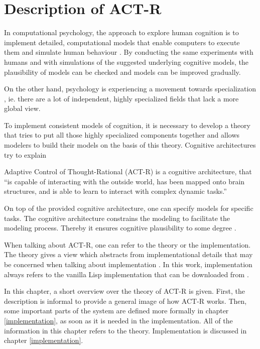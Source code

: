 \chapter{Description of ACT-R}

In computational psychology, the approach to explore human cognition is to implement detailed, computational models that enable computers to execute them and simulate human behaviour \cite{sun_introduction_2008}. By conducting the same experiments with humans and with simulations of the suggested underlying cognitive models, the plausibility of models can be checked and models can be improved gradually.

On the other hand, psychology is experiencing a movement towards specialization \cite{anderson_integrated_2004}, ie. there are a lot of independent, highly specialized fields that lack a more global view.

To implement consistent models of cognition, it is necessary to develop a theory that tries to put all those highly specialized components together and allows modelers to build their models on the basis of this theory. Cognitive architectures try to explain 


Adaptive Control of Thought-Rational  (ACT-R) is a cognitive architecture, that ``is capable of interacting with the outside world, has been mapped onto brain structures, and is able to learn to interact with complex dynamic tasks.'' \cite[p. 29]{taatgen_modeling_2006} 

On top of the provided cognitive architecture, one can specify models for specific tasks. The cognitive architecture constrains the modeling to facilitate the modeling process. Thereby it ensures cognitive plausibility to some degree \cite[p. 29]{taatgen_modeling_2006}.

When talking about ACT-R, one can refer to the theory or the implementation. The theory gives a view which abstracts from implementational details that may be concerned when talking about implementation . In this work, implementation always refers to the vanilla Lisp implementation that can be downloaded from \cite{actr_homepage}.

In this chapter, a short overview over the theory of ACT-R is given. First, the description is informal to provide a general image of how ACT-R works. Then, some important parts of the system are defined more formally in chapter \ref{implementation}, as soon as it is needed in the implementation. All of the information in this chapter refers to the theory. Implementation is discussed in chapter \ref{implementation}.

